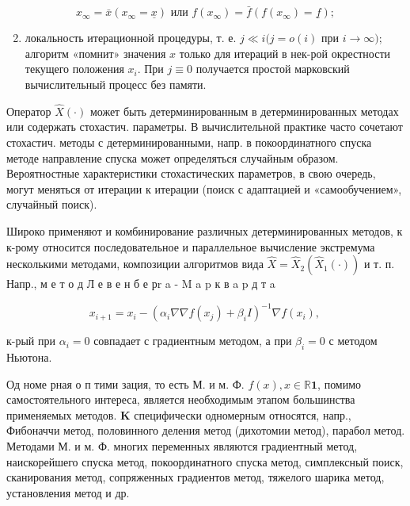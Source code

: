 \documentclass[10pt]{article}
\begin{document}
\[

x_{\infty}=\bar{x}\left(x_{\infty}=\underline{x}\right) \text { или } f\left(x_{\infty}\right)=\bar{f}\left(f\left(x_{\infty}\right)=\underline{f}\right) ;

\]



\begin{enumerate}

  \setcounter{enumi}{1}

  \item локальность итерационной процедуры, т. е. $j \ll i(j=o(i)$ при $i \rightarrow \infty)$; алгоритм «помнит» значения $x$ только для итераций в нек-рой окрестности текущего положения $x_{i}$. При $j \equiv 0$ получается простой марковский вычислительный процесс без памяти.

\end{enumerate}



Оператор $\hat{X}(\cdot)$ может быть детерминированным в детерминированных методах или содержать стохастич. параметры. В вычислительной практике часто сочетают стохастич. методы с детерминированными, напр. в покоординатного спуска методе направление спуска может определяться случайным образом. Вероятностные характеристики стохастических параметров, в свою очередь, могут меняться от итерации к итерации (поиск с адаптацией и «самообучением», случайный поиск).



Широко применяют и комбинирование различных детерминированных методов, к к-рому относится последовательное и параллельное вычисление экстремума несколькими методами, композиции алгоритмов вида $\widehat{X}=\hat{X}_{2}\left(\hat{X}_{1}(\cdot)\right)$ и т. п. Напр., м е т о д Л е в е н б е рr a - M a p к в a p д т a



\[

x_{i+1}=x_{i}-\left(\alpha_{i} \nabla \nabla f\left(x_{j}\right)+\beta_{i} I\right)^{-1} \nabla f\left(x_{i}\right) \text {, }

\]



к-рый при $\alpha_{i}=0$ совпадает с градиентным методом, а при $\beta_{i}=0$ с методом Ньютона.



Од номе рная о п тими зация, то есть М. и м. Ф. $f(x), x \in \mathbb{R} \mathbf{1}$, помимо самостоятельного интереса, является необходимым этапом большинства применяемых методов. $\mathbf{K}$ специфически одномерным относятся, напр., Фибоначчи метод, половинного деления метод (дихотомии метод), парабол метод. Методами М. и м. Ф. многих переменных являются градиентный метод, наискорейшего спуска метод, покоординатного спуска метод, симплексный поиск, сканирования метод, сопряженных градиентов метод, тяжелого шарика метод, установления метод и др.
\end{document}
